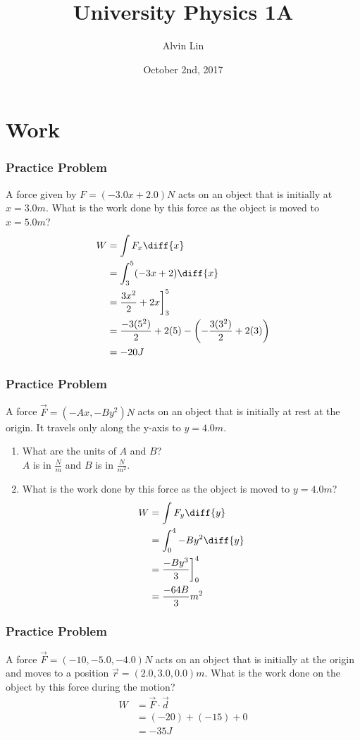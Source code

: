 \documentclass[letterpaper, 12pt]{math}
\title{University Physics 1A}
\author{Alvin Lin}
\date{October 2nd, 2017}
\begin{document}
\maketitle

\section*{Work}

\subsubsection*{Practice Problem}
A force given by \( F = (-3.0x+2.0)N \) acts on an object that is initially at
\( x = 3.0m \). What is the work done by this force as the object is moved to
\( x = 5.0m \)?
\begin{align*}
  W &= \int{F_x\diff{x}} \\
  &= \int_{3}^{5}(-3x+2)\diff{x} \\
  &= \frac{3x^2}{2}+2x\bigg]_3^5 \\
  &= \frac{-3(5^2)}{2}+2(5)-\left(-\frac{3(3^2)}{2}+2(3)\right) \\
  &= -20J
\end{align*}

\subsubsection*{Practice Problem}
A force \( \vec{F} = (-Ax,-By^2)N \) acts on an object that is initially at rest
at the origin. It travels only along the y-axis to \( y = 4.0m \).
\begin{enumerate}
  \item What are the units of \( A \) and \( B \)? \\
  \( A \) is in \( \frac{N}{m} \) and \( B \) is in \( \frac{N}{m^2} \).
  \item What is the work done by this force as the object is moved to
  \( y = 4.0m \)?
  \begin{align*}
    W &= \int{F_y\diff{y}} \\
    &= \int_{0}^{4}-By^2\diff{y} \\
    &= \frac{-By^3}{3}\bigg]_{0}^{4} \\
    &= \frac{-64B}{3}m^2
  \end{align*}
\end{enumerate}

\subsubsection*{Practice Problem}
A force \( \vec{F} = (-10,-5.0,-4.0)N \) acts on an object that is initially at
the origin and moves to a position \( \vec{r} = (2.0,3.0,0.0)m \). What is the
work done on the object by this force during the motion?
\begin{align*}
  W &= \vec{F}\cdot\vec{d} \\
  &= (-20)+(-15)+0 \\
  &= -35J
\end{align*}
\end{document}
